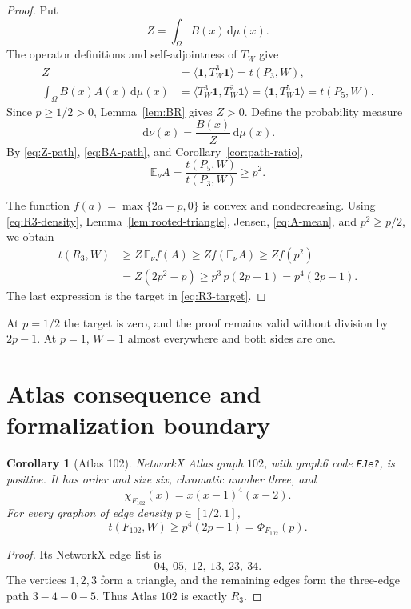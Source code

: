 \documentclass[11pt]{article}
\newtheorem{corollary}[theorem]{Corollary}
\newcommand{\dd}{\,\mathrm d}
\begin{document}
\begin{proof}
Put
\[
 Z=\int_\Omega B(x)\dd\mu(x).
\]
The operator definitions and self-adjointness of $T_W$ give
\begin{align}
 Z&=\langle\mathbf1,T_W^3\mathbf1\rangle=t(P_3,W),
 \label{eq:Z-path}\\
 \int_\Omega B(x)A(x)\dd\mu(x)
 &=\langle T_W^3\mathbf1,T_W^2\mathbf1\rangle
 =\langle\mathbf1,T_W^5\mathbf1\rangle=t(P_5,W).
 \label{eq:BA-path}
\end{align}
Since $p\geq1/2>0$, Lemma~\ref{lem:BR} gives $Z>0$.  Define the probability
measure
\[
 \dd\nu(x)=\frac{B(x)}Z\dd\mu(x).
\]
By \eqref{eq:Z-path}, \eqref{eq:BA-path}, and
Corollary~\ref{cor:path-ratio},
\begin{equation}
 \mathbb E_\nu A=\frac{t(P_5,W)}{t(P_3,W)}\geq p^2.
 \label{eq:A-mean}
\end{equation}

The function $f(a)=\max\{2a-p,0\}$ is convex and nondecreasing.  Using
\eqref{eq:R3-density}, Lemma~\ref{lem:rooted-triangle}, Jensen,
\eqref{eq:A-mean}, and $p^2\geq p/2$, we obtain
\begin{align*}
 t(R_3,W)
 &\geq Z\,\mathbb E_\nu f(A)
 \geq Z f(\mathbb E_\nu A)
 \geq Zf(p^2)
 \\
 &=Z(2p^2-p)
 \geq p^3\,p(2p-1)
 =p^4(2p-1).
\end{align*}
The last expression is the target in \eqref{eq:R3-target}.
\end{proof}

At $p=1/2$ the target is zero, and the proof remains valid without division
by $2p-1$.  At $p=1$, $W=1$ almost everywhere and both sides are one.


\section{Atlas consequence and formalization boundary}

\begin{corollary}[Atlas 102]
NetworkX Atlas graph $102$, with graph6 code \texttt{EJe?}, is positive.
It has order and size six, chromatic number three, and
\[
 \chi_{F_{102}}(x)=x(x-1)^4(x-2).
\]
For every graphon of edge density $p\in[1/2,1]$,
\[
 t(F_{102},W)\geq p^4(2p-1)=\Phi_{F_{102}}(p).
\]
\end{corollary}

\begin{proof}
Its NetworkX edge list is
\[
 04,\ 05,\ 12,\ 13,\ 23,\ 34.
\]
The vertices $1,2,3$ form a triangle, and the remaining edges form the
three-edge path $3-4-0-5$.  Thus Atlas $102$ is exactly $R_3$.
\end{proof}
\end{document}
